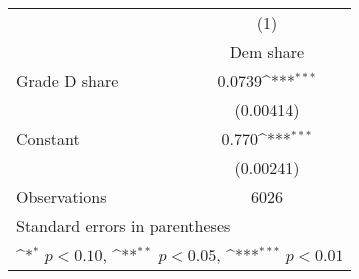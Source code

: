 {
\def\sym#1{\ifmmode^{#1}\else\(^{#1}\)\fi}
\begin{tabular}{l*{1}{c}}
\toprule
                    &\multicolumn{1}{c}{(1)}\\
                    &\multicolumn{1}{c}{Dem share}\\
\midrule
Grade D share       &      0.0739\sym{***}\\
                    &   (0.00414)         \\
\addlinespace
Constant            &       0.770\sym{***}\\
                    &   (0.00241)         \\
\midrule
Observations        &        6026         \\
\bottomrule
\multicolumn{2}{l}{\footnotesize Standard errors in parentheses}\\
\multicolumn{2}{l}{\footnotesize \sym{*} \(p<0.10\), \sym{**} \(p<0.05\), \sym{***} \(p<0.01\)}\\
\end{tabular}
}
